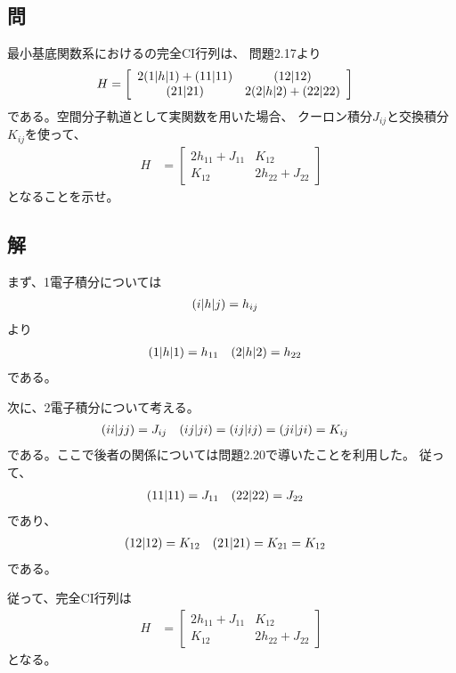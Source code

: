 \subsection{問}
最小基底関数系におけるの完全CI行列は、
問題2.17より
\begin{align}
	H
&=
	\left[
	\begin{array}{cc}
		2{(1|h|1)}
		+
		{(11|11)} &
		{(12|12)} \\
		{(21|21)} &
		2{(2|h|2)}
		+
		{(22|22)}
	\end{array}
	\right]
\end{align}
である。空間分子軌道として実関数を用いた場合、
クーロン積分$J_{ij}$と交換積分$K_{ij}$を使って、
\begin{align}
	H
&=
	\left[
	\begin{array}{cc}
		2h_{11}
		+
		J_{11} &
		K_{12} \\
		K_{12} &
		2h_{22}
		+
		J_{22}
	\end{array}
	\right]
\end{align}
となることを示せ。


\subsection{解}
まず、1電子積分については
\begin{align}
	{\ensuremath{(i|h|j)}}
&=
	h_{ij}
\end{align}
より
\begin{align}
	\spaceone{1}{h}{1}
&=
	h_{11} &
%
	\spaceone{2}{h}{2}
&=
	h_{22}
\end{align}
である。

次に、2電子積分について考える。
\begin{align}
	\spacetwo{ii}{jj}
&=
	J_{ij} &
%
	\spacetwo{ij}{ji}
&=
	\spacetwo{ij}{ij}
=
	\spacetwo{ji}{ji}
=
	K_{ij}
\end{align}
である。ここで後者の関係については問題2.20で導いたことを利用した。
従って、
\begin{align}
	\spacetwo{11}{11}
&=
	J_{11} &
%
	\spacetwo{22}{22}
&=
	J_{22}
\end{align}
であり、
\begin{align}
	\spacetwo{12}{12}
&=
	K_{12} &
%
	\spacetwo{21}{21}
&=
	K_{21}
=
	K_{12}
\end{align}
である。

従って、完全CI行列は
\begin{align}
	H
&=
	\left[
	\begin{array}{cc}
		2h_{11}
		+
		J_{11} &
		K_{12} \\
		K_{12} &
		2h_{22}
		+
		J_{22}
	\end{array}
	\right]
\end{align}
となる。
